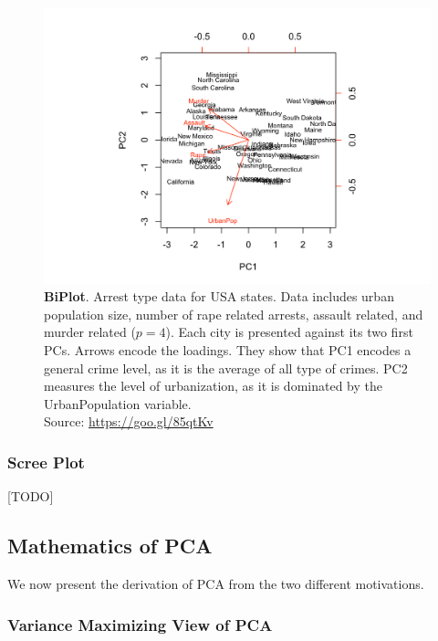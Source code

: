 \documentclass[12pt,a4paper]{article}
\begin{document}
\begin{figure}[ht]
	\centering
	\includegraphics[width=0.7\linewidth]{USAarrests}
	\caption{\textbf{BiPlot}.
		Arrest type data for USA states. 
		Data includes urban population size, number of rape related arrests, assault related, and murder related ($p=4$). 
		Each city is presented against its two first PCs. 
		Arrows encode the loadings. 
		They show that PC1 encodes a general crime level, as it is the average of all type of crimes. 
		PC2 measures the level of urbanization, as it is dominated by the UrbanPopulation variable. 		
		\\ Source: \url{https://goo.gl/85qtKv}}
	\label{fig:usaarrests}
\end{figure}



\subsubsection{Scree Plot}
\label{sec:scree_plot}
[TODO]



\subsection{Mathematics of PCA}
\label{sec:pca_mathematics}
We now present the derivation of PCA from the two different motivations.

\subsubsection{Variance Maximizing View of PCA}
\end{document}
